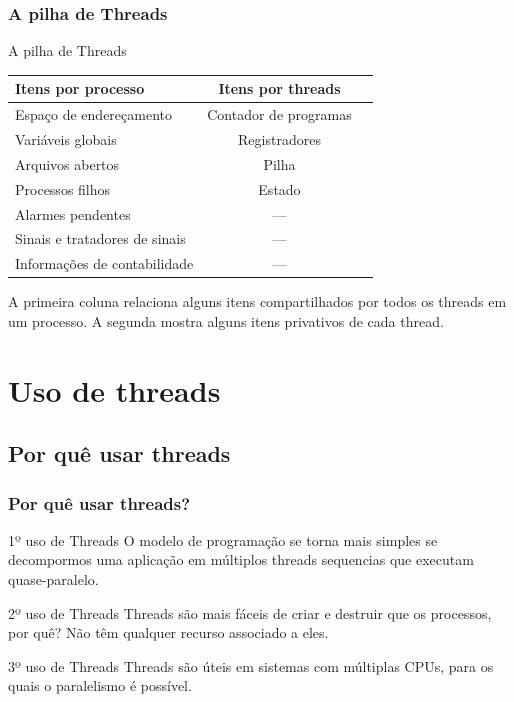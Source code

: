 \documentclass[11pt]{beamer}
\begin{document}
\begin{frame}\frametitle{ A pilha de Threads}

\begin{block}{ A pilha de Threads}
\begin{table}[htbp]
 \scriptsize
	\begin{tabular}{|l|c|c}
	\hline
	\textbf{Itens por processo} & \textbf{Itens por threads}  \\
	  \hline
	  Espaço de endereçamento & Contador de programas \\ \hline
	  Variáveis globais & Registradores \\ \hline
	  Arquivos abertos & Pilha \\ \hline
	  Processos filhos & Estado \\ \hline
	  Alarmes pendentes & ---  \\ \hline
	  Sinais e tratadores de sinais & --- \\ \hline
	  Informações de contabilidade & --- \\ \hline
	\end{tabular}
\end{table}
\end{block}

\pause
A primeira coluna relaciona alguns itens compartilhados por todos os threads em um processo.
A segunda mostra alguns itens privativos de cada thread.

\end{frame}
\section{Uso de threads}
\subsection{Por quê usar threads}

\begin{frame}\frametitle{ Por quê usar threads?}

\begin{block}{ 1º uso de Threads}
O modelo de programação se torna mais simples se decompormos uma aplicação em múltiplos threads sequencias que executam quase-paralelo.
\end{block}

\pause

\begin{block}{2º uso de Threads}
 Threads são mais fáceis de criar e destruir que os processos, por quê?
 \pause
 Não têm qualquer recurso associado a eles.
\end{block}

\pause

\begin{block}{3º uso de Threads}
 Threads são úteis em sistemas com múltiplas CPUs, para os quais o paralelismo é possível.
\end{block}

\end{frame}
\end{document}
